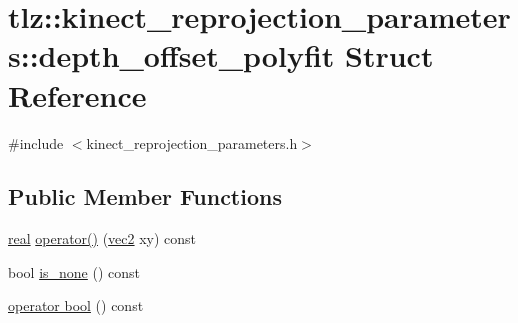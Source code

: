 \hypertarget{structtlz_1_1kinect__reprojection__parameters_1_1depth__offset__polyfit}{}\section{tlz\+:\+:kinect\+\_\+reprojection\+\_\+parameters\+:\+:depth\+\_\+offset\+\_\+polyfit Struct Reference}
\label{structtlz_1_1kinect__reprojection__parameters_1_1depth__offset__polyfit}


{\ttfamily \#include $<$kinect\+\_\+reprojection\+\_\+parameters.\+h$>$}

\subsection*{Public Member Functions}
\begin{DoxyCompactItemize}
\item 
\hyperlink{namespacetlz_a15fd37cce97f2b8b606af18c2615f602}{real} \hyperlink{structtlz_1_1kinect__reprojection__parameters_1_1depth__offset__polyfit_afcd41aa463d82e62efe0eee55ce2a9e3}{operator()} (\hyperlink{namespacetlz_ae192989bfbe6c700ac84d2a8cf05ebb4}{vec2} xy) const 
\item 
bool \hyperlink{structtlz_1_1kinect__reprojection__parameters_1_1depth__offset__polyfit_a265113b81e71bfb85e60a917967f10e5}{is\+\_\+none} () const 
\item 
\hyperlink{structtlz_1_1kinect__reprojection__parameters_1_1depth__offset__polyfit_ae017bf455c1487c8330e0b4214820336}{operator bool} () const 
\end{DoxyCompactItemize}
